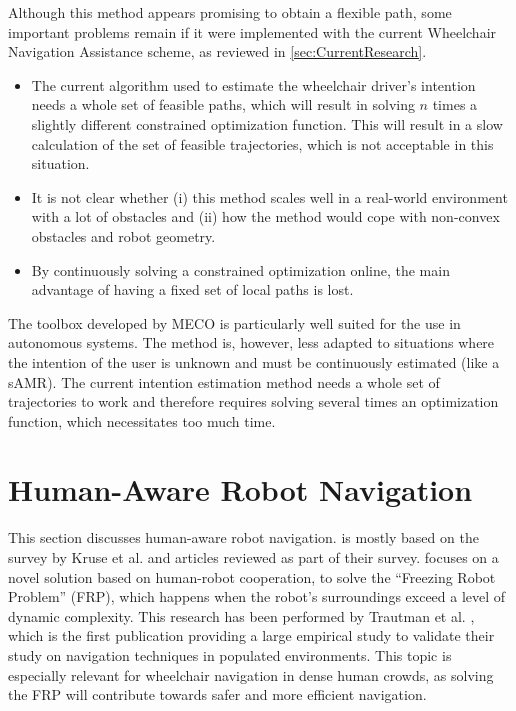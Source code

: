 Although this method appears promising to obtain a flexible path, some important problems remain if it were implemented with the current Wheelchair Navigation Assistance scheme, as reviewed in \cref{sec:CurrentResearch}.
\vspace{1em}
\begin{itemize}
\item The current algorithm used to estimate the wheelchair driver's intention needs a whole set of feasible paths, which will result in solving $n$ times a slightly different constrained optimization function. This will result in a slow calculation of the set of feasible trajectories, which is not acceptable in this situation.
\item It is not clear whether (i) this method scales well in a real-world environment with a lot of obstacles and (ii) how the method would cope with non-convex obstacles and robot geometry.
\item By continuously solving a constrained optimization online, the main advantage of having a fixed set of local paths is lost. 
\end{itemize}
\vspace{1em}

The toolbox developed by MECO is particularly well suited for the use in autonomous systems. The method is, however, less adapted to situations where the intention of the user is unknown and must be continuously estimated (like a sAMR). The current intention estimation method needs a whole set of trajectories to work and therefore requires solving several times an optimization function, which necessitates too much time.

\newpage

\section{Human-Aware Robot Navigation}
This section discusses human-aware robot navigation.  is mostly based on the survey by Kruse et al. \cite{KruseEtAl2013} and articles reviewed as part of their survey.  focuses on a novel solution based on human-robot cooperation, to solve the ``Freezing Robot Problem'' (FRP), which happens when the robot's surroundings exceed a level of dynamic complexity. This research has been performed by Trautman et al. \cite{TrautmanEtAl2015}, which is the first publication providing a large empirical study to validate their study on navigation techniques in populated environments. This topic is especially relevant for wheelchair navigation in dense human crowds, as solving the FRP will contribute towards safer and more efficient navigation.

